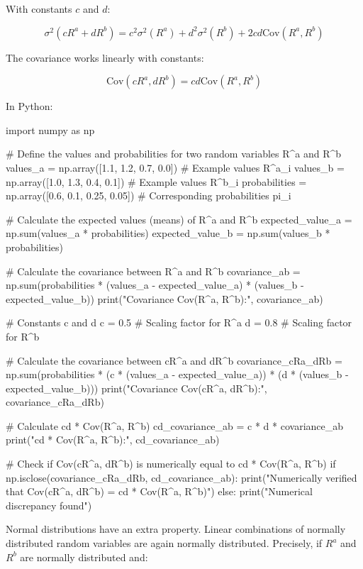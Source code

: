 With constants $c$ and $d$:	

\begin{equation}
    \sigma^2(cR^a + dR^b) = c^2\sigma^2(R^a) + d^2\sigma^2(R^b) + 2cd\text{Cov}(R^a, R^b)
\end{equation}

The covariance works linearly with constants:

\begin{equation}
    \text{Cov}(cR^a, dR^b) = cd\text{Cov}(R^a, R^b)
\end{equation}

In Python:

\begin{python}
import numpy as np

# Define the values and probabilities for two random variables R^a and R^b
values_a = np.array([1.1, 1.2, 0.7, 0.0])  # Example values R^a_i
values_b = np.array([1.0, 1.3, 0.4, 0.1])  # Example values R^b_i
probabilities = np.array([0.6, 0.1, 0.25, 0.05])  # Corresponding probabilities pi_i

# Calculate the expected values (means) of R^a and R^b
expected_value_a = np.sum(values_a * probabilities)
expected_value_b = np.sum(values_b * probabilities)

# Calculate the covariance between R^a and R^b
covariance_ab = np.sum(probabilities * (values_a - expected_value_a) * (values_b - expected_value_b))
print("Covariance Cov(R^a, R^b):", covariance_ab)

# Constants c and d
c = 0.5  # Scaling factor for R^a
d = 0.8  # Scaling factor for R^b

# Calculate the covariance between cR^a and dR^b
covariance_cRa_dRb = np.sum(probabilities * (c * (values_a - expected_value_a)) * (d * (values_b - expected_value_b)))
print("Covariance Cov(cR^a, dR^b):", covariance_cRa_dRb)

# Calculate cd * Cov(R^a, R^b)
cd_covariance_ab = c * d * covariance_ab
print("cd * Cov(R^a, R^b):", cd_covariance_ab)

# Check if Cov(cR^a, dR^b) is numerically equal to cd * Cov(R^a, R^b)
if np.isclose(covariance_cRa_dRb, cd_covariance_ab):
    print("Numerically verified that Cov(cR^a, dR^b) = cd * Cov(R^a, R^b)")
else:
    print("Numerical discrepancy found")
\end{python}

Normal distributions have an extra property. 
Linear combinations of normally distributed random variables 
are again normally distributed. 
Precisely, if $R^a$ and $R^b$ are normally distributed and:

